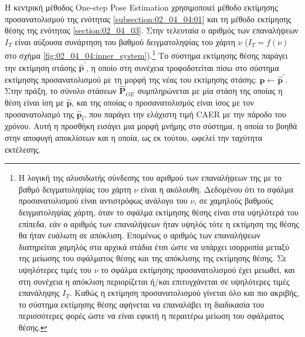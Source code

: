 Η κεντρική μέθοδος One-step Pose Estimation χρησιμοποιεί μέθοδο εκτίμησης
προσανατολισμού της ενότητας \ref{subsection:02_04_04:01} και τη μέθοδο
εκτίμησης θέσης της ενότητας \ref{section:02_04_03}.  Στην τελευταία ο αριθμός
των επαναλήψεων $I_T$ είναι αύξουσα συνάρτηση του βαθμού δειγματοληψίας του
χάρτη $\nu$ ($I_T = f(\nu)$ στο σχήμα
\ref{fig:02_04_04:inner_system}).\footnote{Η λογική της αλυσιδωτής σύνδεσης του
αριθμού των επαναλήψεων της με το βαθμό δειγματοληψίας του χάρτη $\nu$ είναι η
ακόλουθη. Δεδομένου ότι το σφάλμα προσανατολισμού είναι αντιστρόφως ανάλογο του
$\nu$, σε χαμηλούς βαθμούς δειγματοληψίας χάρτη, όταν το σφάλμα εκτίμησης θέσης
είναι στα υψηλότερά του επίπεδα, εάν ο αριθμός των επαναλήψεων ήταν υψηλός τότε
η εκτίμηση της θέσης θα ήταν ευάλωτη σε απόκλιση.  Επομένως ο αριθμός των
επαναλήψεων διατηρείται χαμηλός στα αρχικά στάδια έτσι ώστε να υπάρχει
ισορροπία μεταξύ της μείωσης του σφάλματος θέσης και της απόκλισης της
εκτίμησης θέσης. Σε υψηλότερες τιμές του $\nu$ το σφάλμα εκτίμησης
προσανατολισμού έχει μειωθεί, και στη συνέχεια η απόκλιση περιορίζεται ή/και
επιτυγχάνεται σε υψηλότερες τιμές επανάληψης $I_T$. Καθώς η εκτίμηση
προσανατολισμού γίνεται όλο και πιο ακριβής, το σύστημα εκτίμησης θέσης
αφήνεται να επαναλάβει τη διαδικασία του περισσότερες φορές ώστε να είναι
εφικτή η περαιτέρω μείωση του σφάλματος θέσης.} Το σύστημα εκτίμησης θέσης
παράγει την εκτίμηση στάσης $\hat{\bm{p}}^\prime$, η οποίο στη συνέχεια
τροφοδοτείται πίσω στο σύστημα εκτίμησης προσανατολισμού με τη μορφή της νέας
του εκτίμησης στάσης: $\hat{\bm{p}} \leftarrow \hat{\bm{p}}^\prime$. Στην
πράξη, το σύνολο στάσεων $\hat{\bm{P}}_{OE}$ συμπληρώνεται με μία στάση της
οποίας η θέση είναι ίση με $\hat{\bm{p}}$, και της οποίας ο προσανατολισμός
είναι ίσος με τον προσανατολισμό της $\hat{\bm{p}}_C$ που παράγει την ελάχιστη
τιμή CAER με την πάροδο του χρόνου. Αυτή η προσθήκη εισάγει μια μορφή μνήμης
στο σύστημα, η οποία το βοηθά στην αποφυγή αποκλίσεων και η οποία, ως εκ
τούτου, ωφελεί την ταχύτητα εκτέλεσης.
